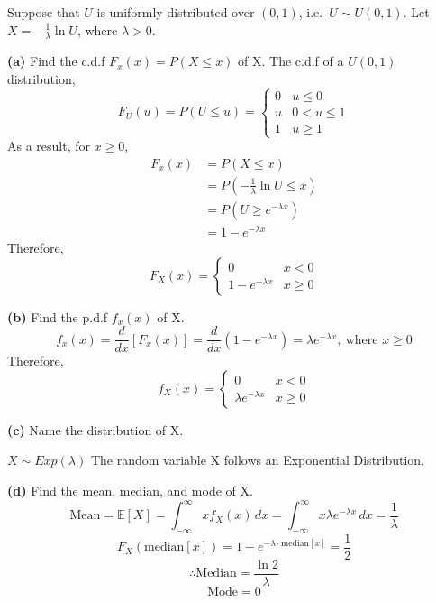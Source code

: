 \documentclass[
]{book}
\begin{document}
Suppose that \(U\) is uniformly distributed over \((0,1)\), i.e.~\(U \sim U(0,1)\). Let \(X = -\frac{1}{\lambda}\ln{U}\), where \(\lambda > 0\).

\textbf{(a)} Find the c.d.f \(F_x(x) = P(X \leq x)\) of X.
The c.d.f of a \(U(0,1)\) distribution,
\[
\begin{equation}
  F_U(u) = P(U \leq u) = 
  \begin{cases}
    0   &   u \leq 0 \\
    u   &   0 < u \leq 1 \\
    1   &   u \geq 1
  \end{cases}
\end{equation}
\]
As a result, for \(x \geq 0\),
\[\begin{align}
  F_x(x) &= P(X \leq x) \\ 
  &= P(-\frac{1}{\lambda}\ln{U} \leq x) \\
         &= P(U \geq e^{-\lambda x}) \\
         &= 1 - e^{-\lambda x}
\end{align}\]
Therefore,
\[
\begin{equation}
  F_X(x) = 
  \begin{cases}
    0   &   x < 0 \\
    1 - e^{-\lambda x}    &   x \geq 0
  \end{cases}
\end{equation}
\]

\textbf{(b)} Find the p.d.f \(f_x(x)\) of X.
\[f_x(x) = \frac{d}{dx} [F_x(x)] = \frac{d}{dx} (1 - e^{-\lambda x}) = \lambda e^{-\lambda x}, \ \text{where } x \geq 0\]
Therefore,
\[
\begin{equation}
  f_X(x) = 
  \begin{cases}
    0   &   x < 0 \\
    \lambda e^{-\lambda x}   &   x \geq 0
  \end{cases}
\end{equation}
\]

\textbf{(c)} Name the distribution of X.

\(X \sim Exp(\lambda)\)
The random variable X follows an Exponential Distribution.

\textbf{(d)} Find the mean, median, and mode of X.
\[\text{Mean} = \mathbb{E}[X] = \int_{-\infty}^{\infty} xf_X(x) \,dx = \int_{-\infty}^{\infty} x \lambda e^{-\lambda x} \,dx = \frac{1}{\lambda}\]
\[F_X(\text{median}[x]) = 1 - e^{-\lambda \cdot \text{median}[x]}= \frac{1}{2}\]
\[\therefore \text{Median} = \frac{\ln{2}}{\lambda}\]
\[\text{Mode} = 0\]
\end{document}
